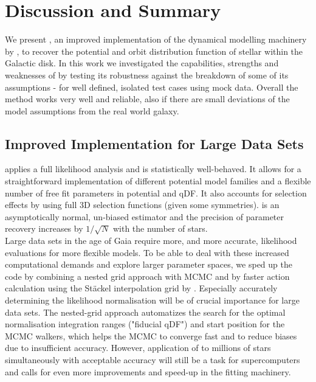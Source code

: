 \section{Discussion and Summary} \label{sec:discussionsummary}

We present \RM, an improved implementation of the dynamical modelling machinery by \citet{bov13}, to recover the potential and orbit distribution function of stellar \MAPs within the Galactic disk. In this work we investigated the capabilities, strengths and weaknesses of \RM by testing its robustness against the breakdown of some of its assumptions - for well defined, isolated test cases using mock data. Overall the method works very well and reliable, also if there are small deviations of the model assumptions from the real world galaxy.

\subsection{Improved Implementation for Large Data Sets}

\RM applies a full likelihood analysis and is statistically well-behaved. It allows for a straightforward implementation of different potential model families and a flexible number of free fit parameters in potential and qDF. It also accounts for selection effects by using full 3D selection functions (given some symmetries). \RM is an asymptotically normal, un-biased estimator and the precision of parameter recovery increases by $1/\sqrt{N}$ with the number of stars.\\

Large data sets in the age of Gaia require more, and more accurate, likelihood evaluations for more flexible models. To be able to deal with these increased computational demands and explore larger parameter spaces, we sped up the code by combining a nested grid approach with MCMC and by faster action calculation using the St\"{a}ckel \citep{bin12} interpolation grid by \citet{bov15}. Especially accurately determining the likelihood normalisation will be of crucial importance for large data sets. The nested-grid approach automatizes the search for the optimal normalisation integration ranges ("fiducial qDF") and start position for the MCMC walkers, which helps the MCMC to converge fast and to reduce biases due to insufficient accuracy. However, application of \RM to millions of stars simultaneously with acceptable accuracy will still be a task for supercomputers and calls for even more improvements and speed-up in the fitting machinery.

